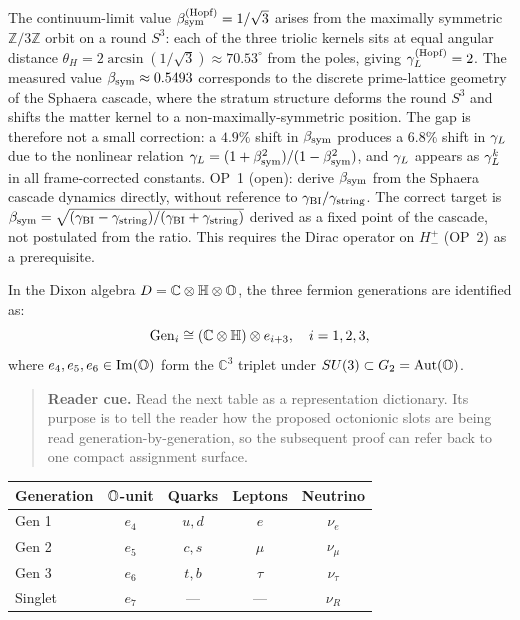 \begin{remark}
\label{rem:bsym-hopf-gap}
The continuum-limit value $\beta_{\mathrm{sym}}^{(\rm Hopf)}=1/\sqrt{3}$ arises from
the maximally symmetric $\mathbb{Z}/3\mathbb{Z}$ orbit on a round $S^3$:
each of the three triolic kernels sits at equal angular distance
$\theta_H=2\arcsin(1/\sqrt{3})\approx 70.53^\circ$ from the poles,
giving $\gamma_L^{(\rm Hopf)}=2$.
The measured value $\beta_{\mathrm{sym}}\approx 0.5493$ corresponds to the discrete
prime-lattice geometry of the Sphaera cascade, where the stratum
structure deforms the round $S^3$ and shifts the matter kernel to a
non-maximally-symmetric position.
The gap is therefore not a small correction: a $4.9\%$ shift in $\beta_{\mathrm{sym}}$
produces a $6.8\%$ shift in $\gamma_L$ due to the nonlinear relation
$\gamma_L=(1+\beta_{\mathrm{sym}}^2)/(1-\beta_{\mathrm{sym}}^2)$, and $\gamma_L$ appears as $\gamma_L^k$ in all
frame-corrected constants.
OP~1 (open): derive $\beta_{\mathrm{sym}}$ from the Sphaera cascade dynamics directly,
without reference to $\gamma_{\mathrm{BI}}/\gamma_{\mathrm{string}}$. The correct target is
$\beta_{\mathrm{sym}}=\sqrt{(\gamma_{\mathrm{BI}}-\gamma_{\mathrm{string}})/(\gamma_{\mathrm{BI}}+\gamma_{\mathrm{string}})}$ derived as a fixed point
of the cascade, not postulated from the ratio. This requires the
Dirac operator on $H^+_-$ (OP~2) as a prerequisite.
\end{remark}

\begin{theorem}
\label{thm:three-generations}
In the Dixon algebra $D=\mathbb{C}\otimes\mathbb{H}\otimes\mathbb{O}$, the three
fermion generations are identified as:
\[
  \mathrm{Gen}_i \cong (\mathbb{C}\otimes\mathbb{H})\otimes e_{i+3},
  \quad i=1,2,3,
\]
where $e_4,e_5,e_6\in\mathrm{Im}(\mathbb{O})$ form the $\mathbb{C}^3$ triplet
under $SU(3)\subset G_2=\mathrm{Aut}(\mathbb{O})$.
\begin{quote}\small
\noindent\textbf{Reader cue.} Read the next table as a representation dictionary. Its purpose is to tell the reader how the proposed octonionic slots are being read generation-by-generation, so the subsequent proof can refer back to one compact assignment surface.
\end{quote}
\begin{center}
\renewcommand{\arraystretch}{1.2}
{\small\setlength{\tabcolsep}{4pt}\begin{tabular}{@{}p{}cccc@{}}
\toprule
Generation & $\mathbb{O}$-unit & Quarks & Leptons & Neutrino\\
\midrule
Gen 1 & $e_4$ & $u,d$ & $e$ & $\nu_e$\\
Gen 2 & $e_5$ & $c,s$ & $\mu$ & $\nu_\mu$\\
Gen 3 & $e_6$ & $t,b$ & $\tau$ & $\nu_\tau$\\
Singlet & $e_7$ & --- & --- & $\nu_R$\\
\bottomrule
\end{tabular}}
\end{center}
\end{theorem}

